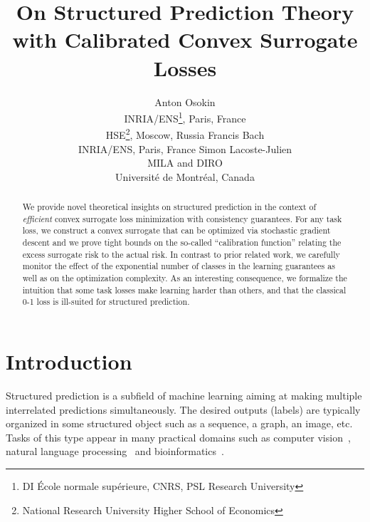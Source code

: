 \documentclass{article}
\begin{document}
 
\title{On Structured Prediction Theory with Calibrated Convex Surrogate Losses}

\author{
    Anton Osokin \\
    INRIA/ENS\thanks{DI \'{E}cole normale sup\'{e}rieure, CNRS, PSL Research University}, Paris, France\\
    HSE\thanks{National Research University Higher School of Economics}, Moscow, Russia
    \And
    Francis Bach\\
    INRIA/ENS\footnotemark[1], Paris, France
%
%
%
    \And
    Simon Lacoste-Julien\\
    MILA and DIRO \\
     Universit\'{e} de Montr\'{e}al, Canada
}

\maketitle

\begin{abstract}
We provide novel theoretical insights on structured prediction in the context of \emph{efficient} convex surrogate loss minimization with consistency guarantees.
For any task loss, we construct a convex surrogate that can be optimized via stochastic gradient descent and we prove tight bounds on the so-called ``calibration function'' relating the excess surrogate risk to the actual risk.
In contrast to prior related work, we carefully monitor the effect of the exponential number of classes in the learning guarantees as well as on the optimization complexity.
As an interesting consequence, we formalize the intuition that some task losses make learning harder than others, and that the classical 0-1 loss is ill-suited for structured prediction.
%
%
%
%
\end{abstract}

\setcounter{footnote}{0}
\section{Introduction}
\label{sec:intro}
Structured prediction is a subfield of machine learning aiming at making multiple interrelated predictions simultaneously. 
The desired outputs (labels) are typically organized in some structured object such as a sequence, a graph, an image, etc.
Tasks of this type appear in many practical domains such as computer vision~\citep{nowozin2011structured}, natural language processing~\citep{smith2011linguistic} and bioinformatics~\citep{durbin1998bio}.
\end{document}

